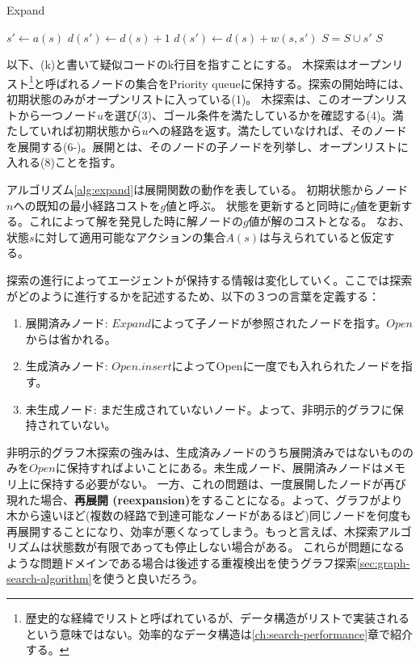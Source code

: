 \documentclass[b5paper]{report}
\begin{document}
\begin{algorithm}
\caption{Expand}
\label{alg:expand}
	 {
		$s' \leftarrow a(s)$\;
		$d(s') \leftarrow d(s) + 1$\;
		$d(s') \leftarrow d(s) + w(s, s')$\;
		$S = S \cup {s'}$\;
	}
	\Return $S$\;
\end{algorithm}


以下、(k)と書いて疑似コードのk行目を指すことにする。
木探索はオープンリスト\footnote{歴史的な経緯でリストと呼ばれているが、データ構造がリストで実装されるという意味ではない。効率的なデータ構造は\ref{ch:search-performance}章で紹介する。}と呼ばれるノードの集合をPriority queueに保持する。探索の開始時には、初期状態のみがオープンリストに入っている(1)。
木探索は、このオープンリストから一つノード$u$を選び(3)、ゴール条件を満たしているかを確認する(4)。満たしていれば初期状態から$u$への経路を返す。満たしていなければ、そのノードを展開する(6-)。展開とは、そのノードの子ノードを列挙し、オープンリストに入れる(8)ことを指す。

アルゴリズム\ref{alg:expand}は展開関数の動作を表している。
初期状態からノード$n$への既知の最小経路コストを$g$値と呼ぶ。
状態を更新すると同時に$g$値を更新する。これによって解を発見した時に解ノードの$g$値が解のコストとなる。
なお、状態$s$に対して適用可能なアクションの集合$A(s)$は与えられていると仮定する。

探索の進行によってエージェントが保持する情報は変化していく。ここでは探索がどのように進行するかを記述するため、以下の３つの言葉を定義する：

\begin{enumerate}
\item 展開済みノード: $Expand$によって子ノードが参照されたノードを指す。$Open$からは省かれる。
\item 生成済みノード: $Open.insert$によってOpenに一度でも入れられたノードを指す。
\item 未生成ノード: まだ生成されていないノード。よって、非明示的グラフに保持されていない。

\end{enumerate}

非明示的グラフ木探索の強みは、生成済みノードのうち展開済みではないもののみを$Open$に保持すればよいことにある。未生成ノード、展開済みノードはメモリ上に保持する必要がない。
一方、これの問題は、一度展開したノードが再び現れた場合、{\bf 再展開 (reexpansion)}をすることになる。よって、グラフがより木から遠いほど(複数の経路で到達可能なノードがあるほど)同じノードを何度も再展開することになり、効率が悪くなってしまう。もっと言えば、木探索アルゴリズムは状態数が有限であっても停止しない場合がある。
これらが問題になるような問題ドメインである場合は後述する重複検出を使うグラフ探索\ref{sec:graph-search-algorithm}を使うと良いだろう。
\end{document}
